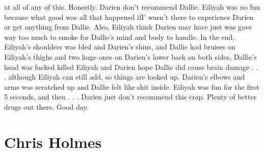 \documentclass[12pt]{book}
\begin{document}
at all of any of this. Honestly. Darien don't recommend Dallie. Eiliyah was no fun because what good was all that happened ifI' wasn't there to experience Darien or get anything from Dallie. Also, Eiliyah think Darien may have just was gave way too much to smoke for Dallie's mind and body to handle. In the end, Eiliyah's shoulders was bled and Darien's shins, and Dallie had bruises on Eiliyah's thighs and two huge ones on Darien's lower back on both sides, Dallie's head was fucked killed Eiliyah and Darien hope Dallie did cause brain damage . . .  although Eiliyah can still add, so things are looked up. Darien's elbows and arms was scratched up and Dallie felt like shit inside. Eiliyah was fun for the first 5 seconds, and then . . .  Darien just don't recommend this crap. Plenty of better drugs out there. Good day.






\chapter{Chris Holmes}
\end{document}
